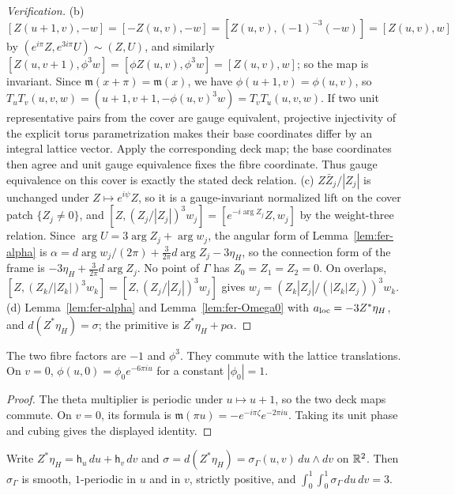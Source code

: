 \begin{proof}[Verification]
(b) $[Z(u+1,v),-w]=[-Z(u,v),-w]=[Z(u,v),(-1)^{-3}(-w)]=[Z(u,v),w]$ by $(e^{i\pi}Z,e^{3i\pi}U)\sim(Z,U)$, and similarly
$[Z(u,v+1),\phi^3w]=[\phi Z(u,v),\phi^3w]=[Z(u,v),w]$; so the map is invariant. Since $\mathfrak m(x+\pi)=\mathfrak m(x)$, we have
$\phi(u+1,v)=\phi(u,v)$, so $T_uT_v(u,v,w)=(u+1,v+1,-\phi(u,v)^3w)=T_vT_u(u,v,w)$. If two unit representative pairs from the cover are gauge equivalent, projective injectivity of the explicit
torus parametrization makes their base coordinates differ by an integral lattice vector.
Apply the corresponding deck map; the base coordinates then agree and unit gauge equivalence fixes the fibre coordinate.
Thus gauge equivalence on this cover is exactly the stated deck relation.
(c) $Z\bar Z_j/|Z_j|$ is unchanged under $Z\mapsto e^{i\psi}Z$, so it is a gauge-invariant normalized lift on the cover patch $\{Z_j\ne0\}$, and
$[Z,(Z_j/|Z_j|)^3w_j]=[e^{-i\arg Z_j}Z,w_j]$ by the weight-three relation. Since $\arg U=3\arg Z_j+\arg w_j$, the angular
form of Lemma~\ref{lem:fer-alpha} is $\alpha=d\arg w_j/(2\pi)+\frac3{2\pi}d\arg Z_j-3\eta_H$, so the connection form of the
frame is $-3\eta_H+\frac3{2\pi}d\arg Z_j$. No point of $\Gamma$ has
$Z_0=Z_1=Z_2=0$. On overlaps, $[Z,(Z_k/|Z_k|)^3w_k]=[Z,(Z_j/|Z_j|)^3w_j]$ gives $w_j=(Z_k|Z_j|/(|Z_k|Z_j))^3w_k$.
(d) Lemma~\ref{lem:fer-alpha} and Lemma~\ref{lem:fer-Omega0} with $a_{\rm loc}=-3Z^*\eta_H$, and $d(Z^*\eta_H)=\sigma$; the
primitive is $Z^*\eta_H+p\alpha$.
\end{proof}

\begin{lemma}\label{lem:fer-clutch}
The two fibre factors are $-1$ and $\phi^3$.
They commute with the lattice translations. On $v=0$,
$\phi(u,0)=\phi_0e^{-6\pi iu}$ for a constant $|\phi_0|=1$.
\end{lemma}
\begin{proof}
The theta multiplier is periodic under $u\mapsto u+1$, so the two deck maps commute.
On $v=0$, its formula is $\mathfrak m(\pi u)=-e^{-i\pi\zeta}e^{-2\pi iu}$.
Taking its unit phase and cubing gives the displayed identity.
\end{proof}

\begin{lemma}\label{lem:fer-sigma}
Write $Z^*\eta_H=\mathsf h_u\,du+\mathsf h_v\,dv$ and $\sigma=d(Z^*\eta_H)=\sigma_\Gamma(u,v)\,du\wedge dv$ on $\mathbb{R}^2$. Then
$\sigma_\Gamma$ is smooth, $1$-periodic in $u$ and in $v$, strictly positive, and
$\int_0^1\!\int_0^1\sigma_\Gamma\,du\,dv=3$.
\end{lemma}

